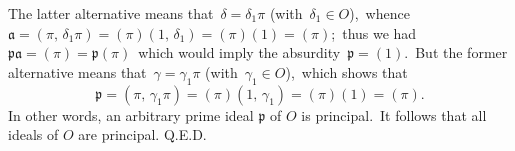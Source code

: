 \documentclass[12pt]{article}
\theoremstyle{definition}
\begin{document}
The latter alternative means that\, $\delta = \delta_1\pi$ (with\, $\delta_1\in O$),\, whence\, $\mathfrak{a} = (\pi,\,\delta_1\pi) = (\pi)(1,\,\delta_1) = (\pi)(1) = (\pi)$;\, thus we had\, $\mathfrak{pa} = (\pi) = \mathfrak{p}(\pi)$\, which would imply the absurdity\, $\mathfrak{p} = (1)$.\, But the former alternative means that\, $\gamma = \gamma_1\pi$ (with\, $\gamma_1\in O$),\, which shows that
$$\mathfrak{p} = (\pi,\,\gamma_1\pi) = (\pi)(1,\,\gamma_1) = (\pi)(1) = (\pi).$$
In other words, an arbitrary prime ideal $\mathfrak{p}$ of $O$ is principal.\, It follows that all ideals of $O$ are principal. Q.E.D.

\end{document}
